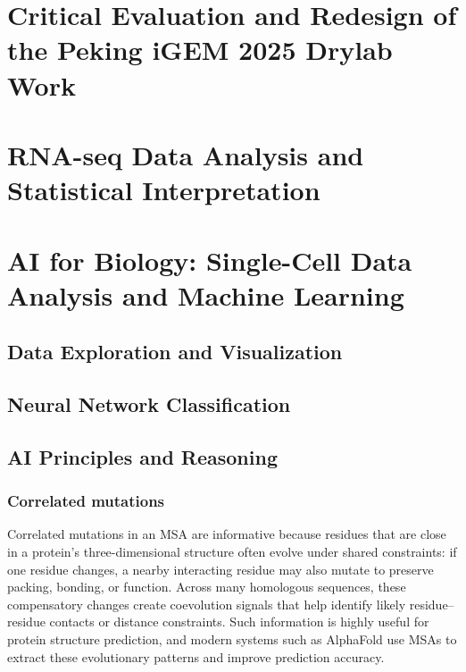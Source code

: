 \documentclass[12pt,a4paper]{article}
\begin{document}
\maketitle

\section{Critical Evaluation and Redesign of the Peking iGEM 2025 Drylab Work}

\section{RNA-seq Data Analysis and Statistical Interpretation}

\section{AI for Biology: Single-Cell Data Analysis and Machine
Learning}

\subsection{Data Exploration and Visualization}

\subsection{Neural Network Classification}

\subsection{AI Principles and Reasoning}
\subsubsection{Correlated mutations}
Correlated mutations in an MSA are informative because residues that are close in a protein's three-dimensional structure often evolve under shared constraints: if one residue changes, a nearby interacting residue may also mutate to preserve packing, bonding, or function. Across many homologous sequences, these compensatory changes create coevolution signals that help identify likely residue--residue contacts or distance constraints. Such information is highly useful for protein structure prediction, and modern systems such as AlphaFold use MSAs to extract these evolutionary patterns and improve prediction accuracy.
\end{document}
